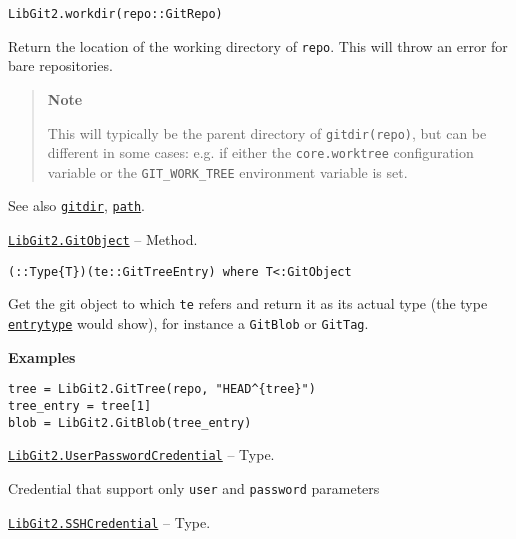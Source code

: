 \begin{adjustwidth}{2em}{0pt}


\begin{verbatim}
LibGit2.workdir(repo::GitRepo)
\end{verbatim}

Return the location of the working directory of \texttt{repo}. This will throw an error for bare repositories.

\begin{quote}
\textbf{Note}

This will typically be the parent directory of \texttt{gitdir(repo)}, but can be different in some cases: e.g. if either the \texttt{core.worktree} configuration variable or the \texttt{GIT\_WORK\_TREE} environment variable is set.

\end{quote}
See also \hyperlink{12125979754140967861}{\texttt{gitdir}}, \hyperlink{7655803558162329563}{\texttt{path}}.



\end{adjustwidth}
\hypertarget{12199863114467893789}{}
\hyperlink{12199863114467893789}{\texttt{LibGit2.GitObject}}  -- {Method.}

\begin{adjustwidth}{2em}{0pt}


\begin{verbatim}
(::Type{T})(te::GitTreeEntry) where T<:GitObject
\end{verbatim}

Get the git object to which \texttt{te} refers and return it as its actual type (the type \hyperlink{5430515144387502914}{\texttt{entrytype}} would show), for instance a \texttt{GitBlob} or \texttt{GitTag}.

\textbf{Examples}


\begin{verbatim}
tree = LibGit2.GitTree(repo, "HEAD^{tree}")
tree_entry = tree[1]
blob = LibGit2.GitBlob(tree_entry)
\end{verbatim}



\end{adjustwidth}
\hypertarget{14233399752683117201}{}
\hyperlink{14233399752683117201}{\texttt{LibGit2.UserPasswordCredential}}  -- {Type.}

\begin{adjustwidth}{2em}{0pt}

Credential that support only \texttt{user} and \texttt{password} parameters



\end{adjustwidth}
\hypertarget{10065416427289604487}{}
\hyperlink{10065416427289604487}{\texttt{LibGit2.SSHCredential}}  -- {Type.}

